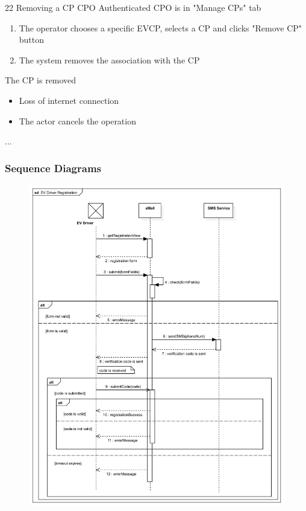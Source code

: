 \usecase
{22}
{Removing a CP} %
{CPO} %
{Authenticated CPO is in "Manage CPs" tab} %
{ %
    \begin{enumerate}
        \item The operator chooses a specific EVCP, selects a CP and clicks "Remove CP" button
        \item The system removes the association with the CP
    \end{enumerate}
}
{The CP is removed} %
{ %
    \begin{itemize}
        \item Loss of internet connection
        \item The actor cancels the operation
    \end{itemize}
}
{ %
    ...
}

\subsubsection*{Sequence Diagrams}
\begin{figure}[H]
    \centering
    \includegraphics[scale=0.9]{src/sequence_diagram/evDriverRegistration.png}
\end{figure}

